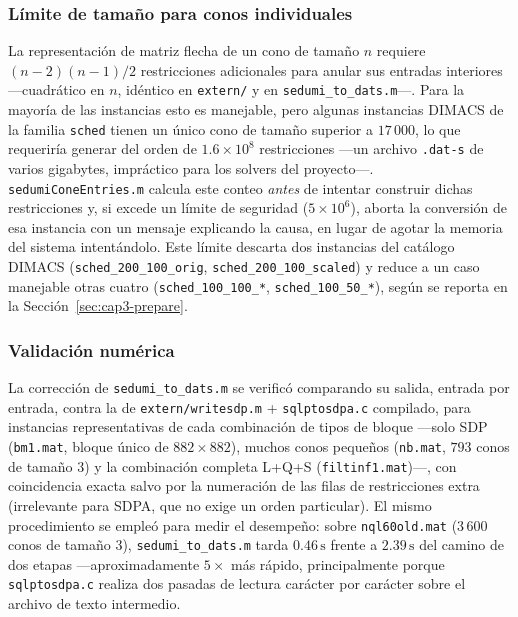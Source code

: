 \subsubsection{L\'imite de tama\~no para conos individuales}

La representaci\'on de matriz flecha de un cono de tama\~no $n$ requiere
$(n-2)(n-1)/2$ restricciones adicionales para anular sus entradas
interiores —cuadr\'atico en $n$, id\'entico en \texttt{extern/} y en
\texttt{sedumi\_to\_dats.m}—. Para la mayor\'ia de las instancias esto es
manejable, pero algunas instancias DIMACS de la familia \texttt{sched}
tienen un \'unico cono de tama\~no superior a $17\,000$, lo que requerir\'ia
generar del orden de $1.6\times10^8$ restricciones —un archivo \texttt{.dat-s}
de varios gigabytes, impr\'actico para los solvers del proyecto—.
\texttt{sedumiConeEntries.m} calcula este conteo \emph{antes} de intentar
construir dichas restricciones y, si excede un l\'imite de seguridad
($5\times10^6$), aborta la conversi\'on de esa instancia con un mensaje
explicando la causa, en lugar de agotar la memoria del sistema intent\'andolo.
Este l\'imite descarta dos instancias del cat\'alogo DIMACS
(\texttt{sched\_200\_100\_orig}, \texttt{sched\_200\_100\_scaled}) y reduce a
un caso manejable otras cuatro (\texttt{sched\_100\_100\_*},
\texttt{sched\_100\_50\_*}), seg\'un se reporta en la
Secci\'on~\ref{sec:cap3-prepare}.

\subsubsection{Validaci\'on num\'erica}

La correcci\'on de \texttt{sedumi\_to\_dats.m} se verific\'o comparando su
salida, entrada por entrada, contra la de \texttt{extern/writesdp.m} +
\texttt{sqlptosdpa.c} compilado, para instancias representativas de cada
combinaci\'on de tipos de bloque —solo SDP (\texttt{bm1.mat}, bloque \'unico
de $882\times882$), muchos conos peque\~nos (\texttt{nb.mat}, $793$ conos de
tama\~no $3$) y la combinaci\'on completa L+Q+S (\texttt{filtinf1.mat})—,
con coincidencia exacta salvo por la numeraci\'on de las filas de
restricciones extra (irrelevante para SDPA, que no exige un orden
particular). El mismo procedimiento se emple\'o para medir el desempe\~no:
sobre \texttt{nql60old.mat} ($3\,600$ conos de tama\~no $3$),
\texttt{sedumi\_to\_dats.m} tarda $0.46\,\mathrm{s}$ frente a
$2.39\,\mathrm{s}$ del camino de dos etapas —aproximadamente $5\times$ m\'as
r\'apido, principalmente porque \texttt{sqlptosdpa.c} realiza dos pasadas de
lectura car\'acter por car\'acter sobre el archivo de texto intermedio.

